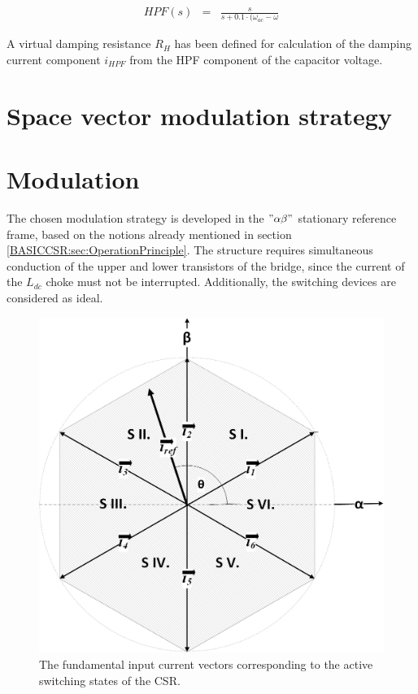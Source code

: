     \begin{equation}
        \begin{array}{rcl}
            HPF(s)&=&\frac{s}{s+0.1\cdot(\omega_{ac}-\omega}
        \end{array}
        \label{EMPC:equ:AC_HPF}
    \end{equation}

    A virtual damping resistance $R_H$ has been defined for calculation of the damping current component $i_{HPF}$ from the HPF component of the capacitor voltage.

\section{Space vector modulation strategy}\section{Modulation}\label{EMPC:sec:Modulation}

    The chosen modulation strategy is developed in the $"\alpha\beta"$ stationary reference frame, based on the notions already mentioned in section \ref{BASICCSR:sec:OperationPrinciple}. The structure requires simultaneous conduction of the upper and lower transistors of the bridge, since the current of the $L_{dc}$  choke must not be interrupted. Additionally, the switching devices are considered as ideal.

    \begin{figure}[!ht]
        \centering
        \includegraphics[width=.6\textwidth]{EMPC_PNG_Pics/VectorPhasor.png}
        \caption{The fundamental input current vectors corresponding to the active switching states of the CSR.}
        \label{EMPC:fig:VectorPhasor}
    \end{figure}

